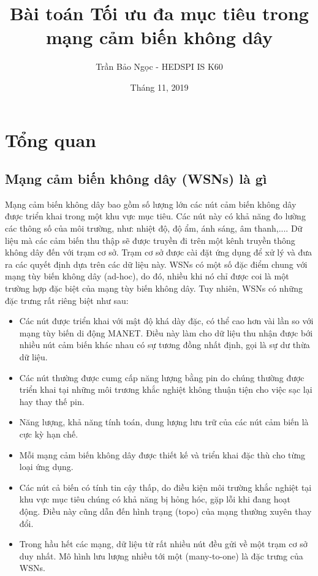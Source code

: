 \documentclass{article}
\title{Bài toán Tối ưu đa mục tiêu trong mạng cảm biến không dây}
\author{Trần Bảo Ngọc - HEDSPI IS K60}
\date{Tháng 11, 2019}
\begin{document}
\maketitle
\tableofcontents

\newpage
\section{Tổng quan}
\subsection{Mạng cảm biến không dây (\gls{WSNs}) là gì}
Mạng cảm biến không dây bao gồm số lượng lớn các nút cảm biến  không dây được triển khai trong một khu vực mục tiêu. Các nút này  có khả năng đo lường các thông số của môi trường, như:  nhiệt độ, độ ẩm, ánh sáng, âm thanh,.... Dữ liệu mà các cảm biến thu thập sẽ được truyền đi trên một kênh truyền thông không dây đến với trạm cơ sở. Trạm cơ sở  được cài đặt ứng dụng để xử lý và đưa ra các quyết định dựa trên các dữ liệu này.
\gls{WSNs} có một số đặc điểm chung với mạng tùy biến không dây (ad-hoc), do đó, nhiều khi nó chỉ được coi là một trường hợp đặc biệt của  mạng tùy biến không dây. Tuy nhiên, \gls{WSNs} có những đặc trưng rất riêng biệt như sau:
\begin{itemize}
    \item Các nút được triển khai với mật độ khá dày đặc, có thể cao hơn vài lần so với mạng tùy biến di động MANET. Điều này làm cho dữ liệu thu nhận được bới nhiều nút cảm biến khác nhau có sự tương đồng nhất định, gọi là sự dư thừa dữ liệu.
    \item Các nút thường được cumg cấp năng lượng bằng pin do chúng thường được triển khai tại những môi trương khắc nghiệt không thuận tiện cho việc sạc lại hay thay thế pin.
    \item Năng lượng, khả năng tính toán, dung lượng lưu trữ của các nút cảm biến là cực kỳ hạn chế.
    \item Mỗi mạng cảm biến không dây được thiết kế và triển khai đặc thù cho từng loại ứng dụng. 
    \item Các nút cả biến có tính tin cậy thấp, do điều kiện môi trường khắc nghiệt tại khu vực mục tiêu chúng có khả năng bị hỏng hóc, gặp lỗi khi đang hoạt động. Điều này cũng dẫn đến hình trạng (topo) của mạng thường xuyên thay đổi.
    \item Trong hầu hết các mạng, dữ liệu từ rất nhiều nút đều gửi về một trạm cơ sở duy nhất. Mô hình lưu lượng nhiều tới một (many-to-one) là đặc trưng của \gls{WSNs}.
\end{itemize}
\end{document}
